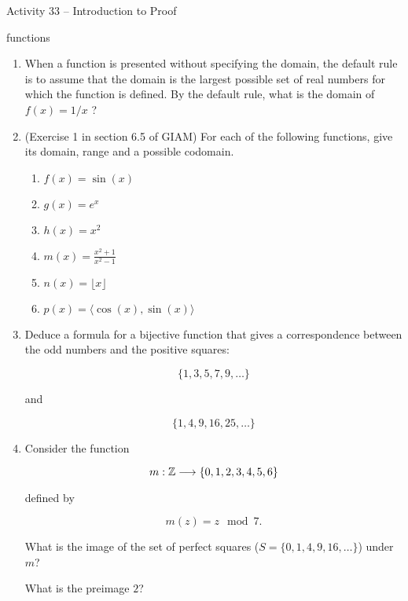 \documentclass{amsart}
\newcommand{\vsp}{\rule[-12pt]{0pt}{48pt}}
\begin{document}
\thispagestyle{empty}

\centerline{\Large Activity 33 -- Introduction to Proof}
\centerline{\large functions}

\bigskip
\Large


\begin{enumerate}
\item When a function is presented without specifying the domain, the default rule is to assume that the domain is the largest possible set of real numbers for which the function is defined.  By the default rule, what is the domain of $f(x)=1/x$ ?

\vfill

\vfill

\item (Exercise 1 in section 6.5 of GIAM) For each of the following functions, give its domain, range and a possible codomain.
\begin{enumerate}
	\item \vsp $f(x) = \sin{(x)}$
	\item \vsp $g(x) = e^x$
	\item \vsp $h(x) = x^2$
	\item \vsp $m(x) = \frac{x^2+1}{x^2-1}$
	\item \vsp $n(x) = \lfloor x \rfloor$
	\item \vsp $p(x) = \langle \cos{(x)}, \sin{(x)} \rangle $
\end{enumerate}

\vfill

\newpage

\item Deduce a formula for a bijective function that gives a correspondence between the odd numbers and the positive squares:

\[ \{1, 3, 5, 7, 9, \ldots \} \]

\noindent and

\[ \{1, 4, 9, 16, 25, \ldots \} \]


\newpage


\item Consider the function 

\[ m:{\mathbb Z} \longrightarrow \{0, 1, 2, 3, 4, 5, 6 \} \]

\noindent defined by

\[ m(z) = z\mod 7. \]


What is the image of the set of perfect squares ($S = \{ 0, 1, 4, 9, 16, \ldots \} $) under $m$?

\vfill 

What is the preimage $2$?


\end{enumerate}
\end{document}
